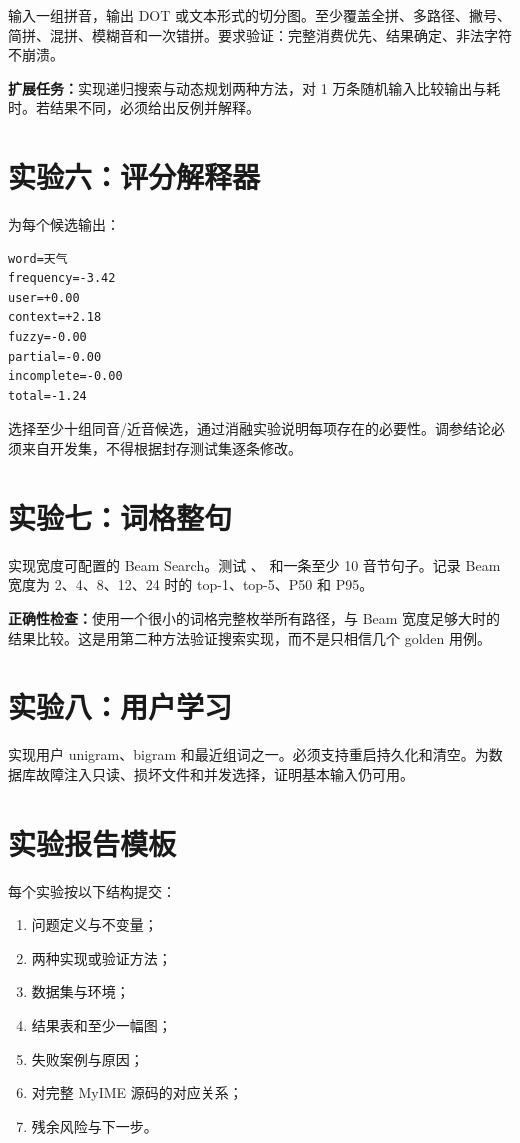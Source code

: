 输入一组拼音，输出 DOT 或文本形式的切分图。至少覆盖全拼、多路径、撇号、简拼、混拼、模糊音和一次错拼。要求验证：完整消费优先、结果确定、非法字符不崩溃。

\textbf{扩展任务：}实现递归搜索与动态规划两种方法，对 1 万条随机输入比较输出与耗时。若结果不同，必须给出反例并解释。

\section{实验六：评分解释器}

为每个候选输出：

\begin{lstlisting}[numbers=none]
word=天气
frequency=-3.42
user=+0.00
context=+2.18
fuzzy=-0.00
partial=-0.00
incomplete=-0.00
total=-1.24
\end{lstlisting}

选择至少十组同音/近音候选，通过消融实验说明每项存在的必要性。调参结论必须来自开发集，不得根据封存测试集逐条修改。

\section{实验七：词格整句}

实现宽度可配置的 Beam Search。测试 、 和一条至少 10 音节句子。记录 Beam 宽度为 2、4、8、12、24 时的 top-1、top-5、P50 和 P95。

\textbf{正确性检查：}使用一个很小的词格完整枚举所有路径，与 Beam 宽度足够大时的结果比较。这是用第二种方法验证搜索实现，而不是只相信几个 golden 用例。

\section{实验八：用户学习}

实现用户 unigram、bigram 和最近组词之一。必须支持重启持久化和清空。为数据库故障注入只读、损坏文件和并发选择，证明基本输入仍可用。

\section{实验报告模板}

每个实验按以下结构提交：

\begin{enumerate}
  \item 问题定义与不变量；
  \item 两种实现或验证方法；
  \item 数据集与环境；
  \item 结果表和至少一幅图；
  \item 失败案例与原因；
  \item 对完整 MyIME 源码的对应关系；
  \item 残余风险与下一步。
\end{enumerate}



